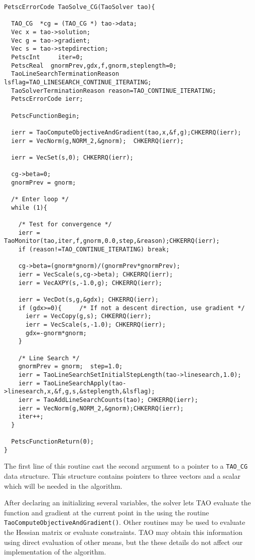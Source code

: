 \begin{verbatim}
PetscErrorCode TaoSolve_CG(TaoSolver tao){

  TAO_CG  *cg = (TAO_CG *) tao->data;
  Vec x = tao->solution;
  Vec g = tao->gradient;
  Vec s = tao->stepdirection;
  PetscInt     iter=0;
  PetscReal  gnormPrev,gdx,f,gnorm,steplength=0;
  TaoLineSearchTerminationReason lsflag=TAO_LINESEARCH_CONTINUE_ITERATING;
  TaoSolverTerminationReason reason=TAO_CONTINUE_ITERATING;
  PetscErrorCode ierr;

  PetscFunctionBegin;

  ierr = TaoComputeObjectiveAndGradient(tao,x,&f,g);CHKERRQ(ierr);
  ierr = VecNorm(g,NORM_2,&gnorm);  CHKERRQ(ierr);

  ierr = VecSet(s,0); CHKERRQ(ierr); 

  cg->beta=0;
  gnormPrev = gnorm;

  /* Enter loop */
  while (1){

    /* Test for convergence */
    ierr = TaoMonitor(tao,iter,f,gnorm,0.0,step,&reason);CHKERRQ(ierr);
    if (reason!=TAO_CONTINUE_ITERATING) break;

    cg->beta=(gnorm*gnorm)/(gnormPrev*gnormPrev);
    ierr = VecScale(s,cg->beta); CHKERRQ(ierr);
    ierr = VecAXPY(s,-1.0,g); CHKERRQ(ierr);
    
    ierr = VecDot(s,g,&gdx); CHKERRQ(ierr);
    if (gdx>=0){     /* If not a descent direction, use gradient */
      ierr = VecCopy(g,s); CHKERRQ(ierr);
      ierr = VecScale(s,-1.0); CHKERRQ(ierr);
      gdx=-gnorm*gnorm;
    } 

    /* Line Search */
    gnormPrev = gnorm;  step=1.0;
    ierr = TaoLineSearchSetInitialStepLength(tao->linesearch,1.0);
    ierr = TaoLineSearchApply(tao->linesearch,x,&f,g,s,&steplength,&lsflag);
    ierr = TaoAddLineSearchCounts(tao); CHKERRQ(ierr);
    ierr = VecNorm(g,NORM_2,&gnorm);CHKERRQ(ierr);
    iter++;
  }
  
  PetscFunctionReturn(0);
}
\end{verbatim}

The first line of this routine cast the second argument to a pointer
to a {\tt TAO\_CG} data structure.  This structure contains pointers
to three vectors and a scalar which will be needed in the algorithm.

After declaring an initializing several variables, the solver lets TAO 
evaluate the function and gradient at the
current point in the using the routine 
{\tt TaoComputeObjectiveAndGradient()}.
Other routines may be used to evaluate the Hessian matrix or evaluate
constraints.  TAO may obtain this information using direct evaluation 
of other means, but the these details do not affect our implementation
of the algorithm.

